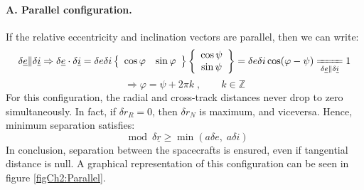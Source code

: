 			\paragraph{\textcolor{GMVred}{A.} Parallel configuration. \\}
			\indent If the relative eccentricity and inclination vectors are parallel, then we can write:
			\[
			\delta\underline{e} \rVert \delta \underline{i} \Rightarrow \delta \underline{e} \cdot \delta\underline{i} = \delta e \delta i 
			\left\{ \begin{array}{cc}
			\cos\varphi & \sin\varphi
			\end{array}\right\}
			\left\{ \begin{array}{c}
			\cos\psi\\
			\sin\psi
			\end{array}\right\} =  \delta e \delta i \cos (\varphi - \psi) \xlongequal[\delta\underline{e} \rVert \delta \underline{i}]{} 1
			\]
			\begin{equation}
			\label{eqCh2:Parallel_ei}\Longrightarrow \varphi = \psi + 2\pi k\; , \qquad k \in \mathbb{Z}
			\end{equation}
			\indent For this configuration, the radial and cross-track distances never drop to zero simultaneously. In fact, if $\delta r_R = 0$, then $\delta r_N$ is maximum, and viceversa. Hence, minimum separation satisfies:
			\[
			\mod{\delta \underline{r}} \geq \min\left(a \delta e, \; a\delta i\right)
			\]
			\indent In conclusion, separation between the spacecrafts is ensured, even if tangential distance is null. A graphical representation of this configuration can be seen in figure \ref{figCh2:Parallel}.

